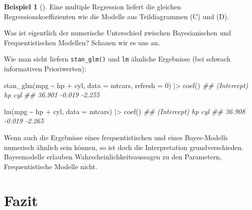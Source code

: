 \documentclass[
  ngerman,
  letterpaper,
  twoside,
  open=any]{scrbook}
\newenvironment{Shaded}{\begin{snugshade}}{\end{snugshade}}
\newcommand{\AttributeTok}[1]{\textcolor[rgb]{0.40,0.45,0.13}{#1}}
\newcommand{\DecValTok}[1]{\textcolor[rgb]{0.68,0.00,0.00}{#1}}
\newcommand{\DocumentationTok}[1]{\textcolor[rgb]{0.37,0.37,0.37}{\textit{#1}}}
\newcommand{\FunctionTok}[1]{\textcolor[rgb]{0.28,0.35,0.67}{#1}}
\newcommand{\NormalTok}[1]{\textcolor[rgb]{0.00,0.23,0.31}{#1}}
\newcommand{\SpecialCharTok}[1]{\textcolor[rgb]{0.37,0.37,0.37}{#1}}
\theoremstyle{definition}
\newtheorem{example}{Beispiel}[chapter]
\theoremstyle{plain}
\theoremstyle{definition}
\theoremstyle{definition}
\theoremstyle{remark}
\begin{document}
\begin{example}[]
Eine multiple Regression liefert die gleichen Regressionskoeffizienten
wie die Modelle aus Teildiagrammen (C) und (D).

Was ist eigentlich der numerische Unterschied zwischen Bayesianischen
und Frequentistischen Modellen? Schauen wir es uns an.

Wie man sieht liefern \texttt{stan\_glm()} und \texttt{lm} ähnliche
Ergebnisse (bei schwach informativen Prioriwerten):

\begin{Shaded}
\begin{Highlighting}[]
\FunctionTok{stan\_glm}\NormalTok{(mpg }\SpecialCharTok{\textasciitilde{}}\NormalTok{ hp }\SpecialCharTok{+}\NormalTok{ cyl, }\AttributeTok{data =}\NormalTok{ mtcars, }\AttributeTok{refresh =} \DecValTok{0}\NormalTok{) }\SpecialCharTok{|\textgreater{}} \FunctionTok{coef}\NormalTok{()}
\DocumentationTok{\#\# (Intercept)          hp         cyl }
\DocumentationTok{\#\#      36.901      {-}0.019      {-}2.255}

\FunctionTok{lm}\NormalTok{(mpg }\SpecialCharTok{\textasciitilde{}}\NormalTok{ hp }\SpecialCharTok{+}\NormalTok{ cyl, }\AttributeTok{data =}\NormalTok{ mtcars) }\SpecialCharTok{|\textgreater{}} \FunctionTok{coef}\NormalTok{()}
\DocumentationTok{\#\# (Intercept)          hp         cyl }
\DocumentationTok{\#\#      36.908      {-}0.019      {-}2.265}
\end{Highlighting}
\end{Shaded}

\begin{tcolorbox}[enhanced jigsaw, arc=.35mm, bottomrule=.15mm, bottomtitle=1mm, breakable, colback=white, colbacktitle=quarto-callout-important-color!10!white, colframe=quarto-callout-important-color-frame, coltitle=black, left=2mm, leftrule=.75mm, opacityback=0, opacitybacktitle=0.6, rightrule=.15mm, title=\textcolor{quarto-callout-important-color}{\faExclamation}\hspace{0.5em}{Wichtig}, titlerule=0mm, toprule=.15mm, toptitle=1mm]

Wenn auch die Ergebnisse eines frequentistischen und eines Bayes-Modells
numerisch ähnlich sein können, so ist doch die Interpretation
grundverschieden. Bayesmodelle erlauben Wahrscheinlichkeitsaussagen zu
den Parametern, Frequentistische Modelle nicht.

\end{tcolorbox}

\section{Fazit}\label{fazit-5}


\end{example}
\end{document}
